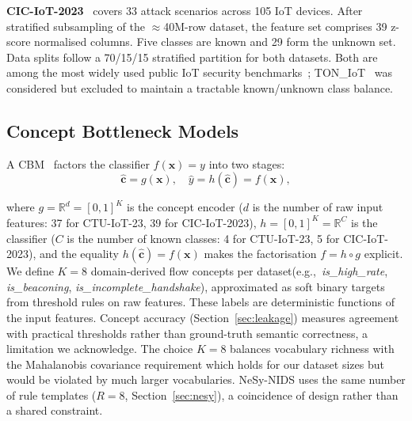 \documentclass[journal]{IEEEtran}
\begin{document}
\textbf{CIC-IoT-2023}~\cite{neto2023ciciot} covers 33 attack scenarios across 105 IoT devices. After stratified subsampling of the $\approx$40M-row dataset, the feature set comprises 39 z-score normalised columns. Five classes are known and 29 form the unknown set. Data splits follow a 70/15/15 stratified partition for both datasets.
Both are among the most widely used public IoT security benchmarks~\cite{dekeersmaeker2023survey};
TON\_IoT~\cite{alsaedi2020toniot} was considered but excluded to maintain a tractable known/unknown class balance.


\subsection{Concept Bottleneck Models}
\label{sec:cbm}

A CBM~\cite{koh2020concept} factors the classifier
$f(\mathbf{x})=y$ into two stages:
\begin{equation}
  \hat{\mathbf{c}} = g(\mathbf{x}),
  \quad\hat{y} = h(\hat{\mathbf{c}}) = f(\mathbf{x}),
\end{equation}
\begin{sloppypar}
where $g=\mathbb{R}^d=[0,1]^K$ is the concept encoder ($d$ is the number of raw input features: 37 for CTU-IoT-23, 39 for CIC-IoT-2023), $h=[0,1]^K=\mathbb{R}^C$ is the classifier ($C$ is the number of known classes: 4 for CTU-IoT-23, 5 for
CIC-IoT-2023), and the equality $h(\hat{\mathbf{c}})=f(\mathbf{x})$ makes the factorisation $f=h\circ g$ explicit.
We define $K{=}8$ domain-derived flow concepts per dataset(e.g.,\ \textit{is\_high\_rate}, \textit{is\_beaconing}, \textit{is\_incomplete\_handshake}), approximated as soft binary targets from threshold rules on raw features. These labels are deterministic functions of the input features. Concept accuracy (Section~\ref{sec:leakage}) measures agreement with practical thresholds rather than ground-truth semantic correctness, a limitation we acknowledge. The choice $K{=}8$ balances vocabulary richness with the Mahalanobis covariance requirement which holds for our dataset sizes but would be violated by much larger vocabularies. NeSy-NIDS uses the same number of rule templates ($R{=}8$, Section~\ref{sec:nesy}), a coincidence of design rather than a shared constraint.
\end{sloppypar}
\end{document}
